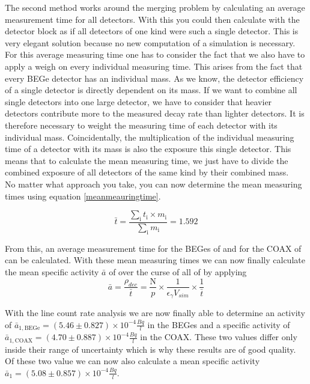 The second method works around the merging problem by calculating an average measurement time for all detectors.
With this you could then calculate with the detector block as if all detectors of one kind were such a single detector.
This is very elegant solution because no new computation of a simulation is necessary.
\\

For this average measuring time one has to consider the fact that we also have to apply a weigh on every individual measuring time.
This arises from the fact that every BEGe detector has an individual mass.
As we know, the detector efficiency of a single detector is directly dependent on its mass.
If we want to combine all single detectors into one large detector, we have to consider that heavier detectors contribute more to the measured decay rate than lighter detectors.
It is therefore necessary to weight the measuring time of each detector with its individual mass.
Coincidentally, the multiplication of the individual measuring time of a detector with its mass is also the exposure this  single detector.
This means that to calculate the mean measuring time, we just have to divide the combined exposure of all detectors of the same kind by their combined mass.
\\

No matter what approach you take, you can now determine the mean measuring times using equation \ref{meanmeauringtime}.

\begin{equation*}
    \bar{t} = \frac{\sum_\mathrm{i} t_\mathrm{i} \times m_\mathrm{i}}{\sum_\mathrm{i} m_\mathrm{i}} = 1.592
\label{meanmeauringtime}
\end{equation*}

From this, an average measurement time for the BEGes of  and for the COAX of can be calculated.
With these mean measuring times we can now finally calculate the mean specific activity $\bar{a}$ of \Kr over the curse of all of \PII by applying
\begin{equation*}
    \bar{a} = \frac{\rho_{dec} }{\bar{t}} = \frac{\mathrm{N}}{p}\times\frac{1}{\epsilon_\gamma V_{sim}}\times\frac{1}{\bar{t}}
\end{equation*}


With the line count rate analysis we are now finally able to determine an activity of $\bar{a}_{\mathrm{1,BEGe}} = (5.46\pm0.827)\times10^{-4}	\frac{\unit{Bq}}{\unit{l}}$ in the BEGes and a specific activity of $\bar{a}_{\mathrm{1,COAX}} = (4.70\pm0.887)\times10^{-4}	\frac{\unit{Bq}}{\unit{l}}$ in the COAX.
These two values differ only inside their range of uncertainty which is why these results are of good quality.
Of these two value we can now also calculate a mean specific activity $\bar{a}_{1} = (5.08\pm0.857)\times10^{-4}\frac{\unit{Bq}}{\unit{l}}$.
\\

